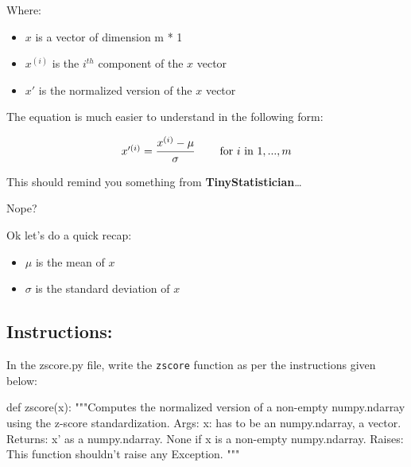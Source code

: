\documentclass[]{article}
\newenvironment{Shaded}{\begin{snugshade}}{\end{snugshade}}
\newcommand{\CommentTok}[1]{\textcolor[rgb]{0.48,0.49,0.49}{#1}}
\newcommand{\KeywordTok}[1]{\textcolor[rgb]{0.81,0.81,0.76}{#1}}
\newcommand{\NormalTok}[1]{\textcolor[rgb]{0.81,0.81,0.76}{#1}}
\begin{document}
Where:

\begin{itemize}
\item
  \(x\) is a vector of dimension m * 1
\item
  \(x^{(i)}\) is the \(i^{th}\) component of the \(x\) vector
\item
  \(x'\) is the normalized version of the \(x\) vector
\end{itemize}

The equation is much easier to understand in the following form:

\large

\[
\begin{matrix}
x'^{(i)} = \cfrac{x^{(i)} - \mu}{\sigma} & &\text{ for $i$ in $1, ..., m$}
\end{matrix}
\] \normalsize

This should remind you something from \textbf{TinyStatistician}\ldots{}

Nope?

Ok let's do a quick recap:

\begin{itemize}
\item
  \(\mu\) is the mean of \(x\)
\item
  \(\sigma\) is the standard deviation of \(x\)
\end{itemize}

\hypertarget{instructions-7}{%
\subsection{Instructions:}\label{instructions-7}}

In the zscore.py file, write the \texttt{zscore} function as per the
instructions given below:

\begin{Shaded}
\begin{Highlighting}[]
\KeywordTok{def}\NormalTok{ zscore(x):}
    \CommentTok{"""Computes the normalized version of a non-empty numpy.ndarray using the z-score standardization.}
\CommentTok{    Args:}
\CommentTok{      x: has to be an numpy.ndarray, a vector.}
\CommentTok{    Returns:}
\CommentTok{      x' as a numpy.ndarray. }
\CommentTok{      None if x is a non-empty numpy.ndarray.}
\CommentTok{    Raises:}
\CommentTok{      This function shouldn't raise any Exception.}
\CommentTok{    """}
\end{Highlighting}
\end{Shaded}
\end{document}
